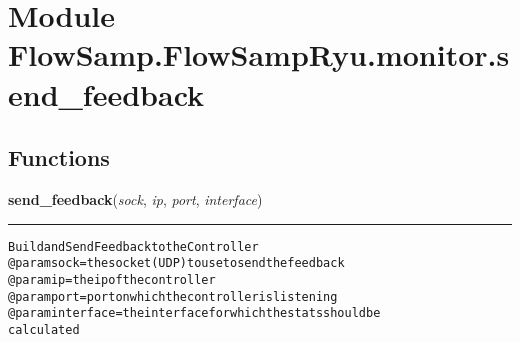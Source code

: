 %
%
%


\section{Module FlowSamp.FlowSampRyu.monitor.send\_feedback}

    \label{FlowSamp:FlowSampRyu:monitor:send_feedback}


  \subsection{Functions}

    \label{FlowSamp:FlowSampRyu:monitor:send_feedback:send_feedback}

    \vspace{0.5ex}

\hspace{.8\funcindent}\begin{boxedminipage}{\funcwidth}

    \raggedright \textbf{send\_feedback}(\textit{sock}, \textit{ip}, \textit{port}, \textit{interface})

    \vspace{-1.5ex}

    \rule{\textwidth}{0.5\fboxrule}
\setlength{\parskip}{2ex}
\begin{alltt}
Build and Send Feedback to the Controller
@param sock = the socket (UDP) to use to send the feedback
@param ip = the ip of the controller
@param port = port on which the controller is listening
@param interface = the interface for which the stats should be
                   calculated
\end{alltt}

\setlength{\parskip}{1ex}
    \end{boxedminipage}

